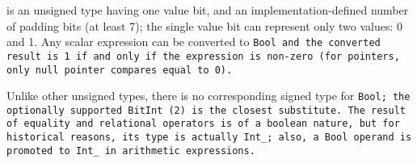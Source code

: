  is an unsigned type having one value bit,
and an implementation-defined number of padding bits (at least 7);
the single value bit can represent only two values: 0 and 1.
Any scalar expression can be converted to \tt{Bool} and the
converted result is 1 if and only if the expression is non-zero
(for pointers, only null pointer compares equal to 0).

\note Unlike other unsigned types, there is no corresponding signed type for
\tt{Bool}; the optionally supported \tt{BitInt (2)} is the closest substitute.
The result of equality and relational operators is of a boolean nature,
but for historical reasons, its type is actually \tt{Int_};
also, a \tt{Bool} operand is promoted to \tt{Int_} in arithmetic expressions.
